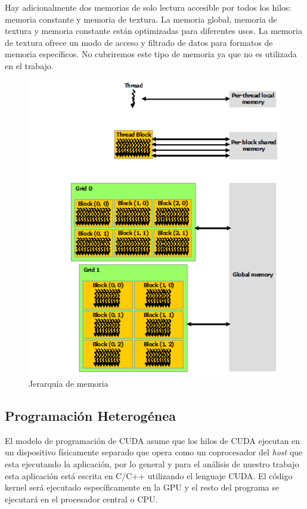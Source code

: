 \documentclass[a4paper,openright,12pt, oneside]{book}
\begin{document}
Hay adicionalmente dos memorias de solo lectura accesible por todos los hilos: memoria
constante y memoria de textura. La memoria global, memoria de textura y memoria
constante est\'an optimizadas para diferentes usos. La memoria de textura ofrece un
modo de acceso y filtrado de datos para formatos de memoria espec\'ificos. No cubriremos
este tipo de memoria ya que no es utilizada en el trabajo.

\begin{figure}[!htbp]
  \begin{center}
    \leavevmode

    \includegraphics[]{memory-hierarchy.png}

    \caption{Jerarqu\'ia de memoria}
    \label{CUDA}
  \end{center}
\end{figure}


\subsection*{Programaci\'on Heterog\'enea}

El modelo de programaci\'on de CUDA asume que los hilos de CUDA ejecutan en un dispositivo
f\'isicamente separado que opera como un coprocesador del \textit{host} que esta ejecutando
la aplicaci\'on, por lo general y para el an\'alisis de nuestro trabajo esta aplicaci\'on 
est\'a escrita en C/C++ utilizando el lenguaje CUDA. El c\'odigo kernel ser\'a ejecutado
espec\'ificamente en la GPU y el resto del programa se ejecutar\'a en el procesador
central o CPU.
\end{document}
